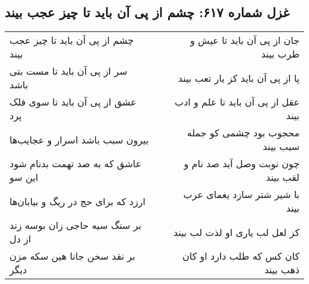 \begin{center}
\section*{غزل شماره ۶۱۷: چشم از پی آن باید تا چیز عجب بیند}
\label{sec:0617}
\begin{longtable}{l p{0.5cm} r}
چشم از پی آن باید تا چیز عجب بیند
&&
جان از پی آن باید تا عیش و طرب بیند
\\
سر از پی آن باید تا مست بتی باشد
&&
پا از پی آن باید کز یار تعب بیند
\\
عشق از پی آن باید تا سوی فلک پرد
&&
عقل از پی آن باید تا علم و ادب بیند
\\
بیرون سبب باشد اسرار و عجایب‌ها
&&
محجوب بود چشمی کو جمله سبب بیند
\\
عاشق که به صد تهمت بدنام شود این سو
&&
چون نوبت وصل آید صد نام و لقب بیند
\\
ارزد که برای حج در ریگ و بیابان‌ها
&&
با شیر شتر سازد یغمای عرب بیند
\\
بر سنگ سیه حاجی زان بوسه زند از دل
&&
کز لعل لب یاری او لذت لب بیند
\\
بر نقد سخن جانا هین سکه مزن دیگر
&&
کان کس که طلب دارد او کان ذهب بیند
\\
\end{longtable}
\end{center}
